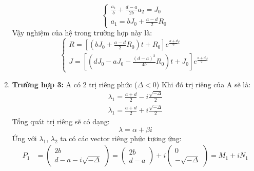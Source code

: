 \documentclass[a4paper]{article}
\begin{document}
\begin{enumerate}
\begin{equation}
\begin{cases}
            \frac{a_1}{b}+\frac{d-a}{2b}a_2 = J_0 \\[3pt]
            a_1 = bJ_0+\frac{a-d}{2}R_0
        \end{cases}
    \end{equation}
    Vậy nghiệm của hệ trong trường hợp này là:
    \begin{equation} \label{eq:17}
        \begin{cases}
            R = \left[\left(bJ_0+\frac{a-d}{2}R_0 \right)t+R_0 \right]e^{\frac{a+d}{2}t} \\[4pt]
            J = \left[\left(dJ_0-aJ_0-\frac{(d-a)^2}{4b}R_0\right)t+J_0\right]e^{\frac{a+d}{2}t}
        \end{cases}
    \end{equation}
    \item \textbf{Trường hợp 3:} A có 2 trị riêng phức ($\Delta < 0$)
    Khi đó trị riêng của A sẽ là:
    \begin{equation} \label{eq:18}
        \begin{split}
            \lambda_1 = \frac{a+d}{2} - i\frac{\sqrt{-\Delta}}{2}  \\
            \lambda_1 = \frac{a+d}{2} + i\frac{\sqrt{-\Delta}}{2}
        \end{split}
    \end{equation}
    Tổng quát trị riêng sẽ có dạng:
    \begin{equation}
        \nonumber
        \lambda = \alpha + \beta i
    \end{equation}
    Ứng với $\lambda_1$, $\lambda_2$ ta có các vector riêng phức tương ứng:
    \begin{equation} \label{eq:19}
        \begin{split}
            P_1& = \begin{pmatrix}
                2b \\
                d -a - i\sqrt{-\Delta}
            \end{pmatrix} = \begin{pmatrix}
                2b \\
                d-a
            \end{pmatrix} +
            i\begin{pmatrix}
                0 \\
                -\sqrt{-\Delta}
            \end{pmatrix} = M_1 + iN_1 \\

\end{split}
\end{equation}
\end{enumerate}
\end{document}
